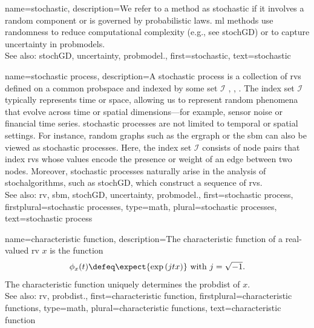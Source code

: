 {name={stochastic},
	description={We refer to a  method as stochastic if it involves a 
		random component or is governed by probabilistic laws. \Gls{ml} methods use randomness 
		to reduce computational complexity (e.g., see \gls{stochGD}) or 
		to capture \gls{uncertainty} in \glspl{probmodel}.
		\\
		See also: \gls{stochGD}, \gls{uncertainty}, \gls{probmodel}.},
	first={stochastic},
	text={stochastic}
}

{name={stochastic process},
	description={A \gls{stochastic} process is a collection of 
		\glspl{rv} defined on a common \gls{probspace} and indexed by some set 
		$\mathcal{I}$ \cite{GrayProbBook}, \cite{papoulis}, \cite{Brockwell91}. The index set 
		$\mathcal{I}$ typically represents time or space, allowing us to represent 
		random phenomena that evolve across time or spatial dimensions—for example, 
		sensor noise or financial time series. \Gls{stochastic} processes are not limited 
		to temporal or spatial settings. For instance, random \glspl{graph} such as 
		the \gls{ergraph} or the \gls{sbm} can also be viewed as \gls{stochastic} processes. 
		Here, the index set $\mathcal{I}$ consists of node pairs that index \glspl{rv} whose values 
		encode the presence or weight of an edge between two nodes. Moreover, \gls{stochastic} 
		processes naturally arise in the analysis of \glspl{stochalgorithm}, 
		such as \gls{stochGD}, which construct a sequence of \glspl{rv}. 
		\\
		See also:  \gls{rv}, \gls{sbm}, \gls{stochGD}, \gls{uncertainty}, \gls{probmodel}.},
	first={stochastic process},
	firstplural={stochastic processes},
	type=math, 
	plural={stochastic processes},
	text={stochastic process}
}

{name={characteristic function},
	description={The characteristic \gls{function} 
		of a real-valued \gls{rv} $x$ is the \gls{function} \cite[Sec. 26]{BillingsleyProbMeasure}
		$$ \phi_{x}(t) \defeq \expect { \exp\,(j t x) } \mbox{ with } j = \sqrt{-1}.$$
	 	The characteristic \gls{function} uniquely determines the \gls{probdist} of $x$. 
		\\
		See also: \gls{rv}, \gls{probdist}.},
	first={characteristic function},
	firstplural={characteristic functions}, 
	type=math, 
	plural={characteristic functions},
	text={characteristic function}
}

